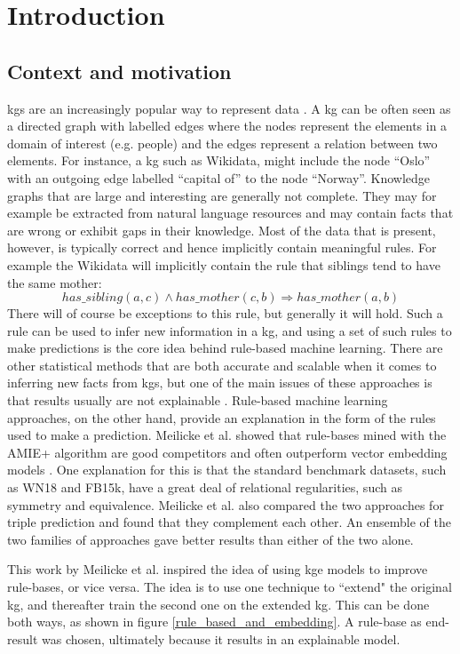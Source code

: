 \chapter{Introduction}
\section{Context and motivation}
\glspl{kg} are an increasingly popular way to represent data \cite{hogan2020knowledge}.
A \gls{kg} can be often seen as a directed graph with labelled edges where the nodes represent the elements in a domain of interest (e.g. people) and the edges represent a relation between two elements. For instance, a \gls{kg} such as Wikidata, might include the node ``Oslo'' with an outgoing edge labelled ``capital of'' to the node ``Norway''. Knowledge graphs that are large and interesting are generally not complete. They may for example be extracted from natural language resources and may contain facts that are wrong or exhibit gaps in their knowledge. Most of the data that is present, however, is typically correct and hence implicitly contain meaningful rules. For example the Wikidata will implicitly contain the rule that siblings tend to have the same mother:
\[has\_sibling(a, c) \wedge has\_mother(c, b) \Rightarrow has\_mother(a, b)\]
There will of course be exceptions to this rule, but generally it will hold. Such a rule can be used to infer new information in a \gls{kg}, and using a set of such rules to make predictions is the core idea behind rule-based machine learning. There are other statistical methods that are both accurate and scalable when it comes to inferring new facts from \glspl{kg}, but one of the main issues of these approaches is that results usually are not explainable \cite{bonatti2019knowledge}. Rule-based machine learning approaches, on the other hand, provide an explanation in the form of the rules used to make a prediction. Meilicke et al. showed that rule-bases mined with the AMIE+ algorithm are good competitors and often outperform vector embedding models \cite{ensemble}. One explanation for this is that the standard benchmark datasets, such as WN18 and FB15k,  have a great deal of relational regularities, such as symmetry and equivalence. Meilicke et al. also compared the two approaches for triple prediction and found that they complement each other. An ensemble of the two families of approaches gave better results than either of the two alone.

This work by Meilicke et al. inspired the idea of using \gls{kge} models to improve rule-bases, or vice versa. The idea is to use one technique to ``extend" the original \gls{kg}, and thereafter train the second one on the extended \gls{kg}. This can be done both ways, as shown in figure \ref{rule_based_and_embedding}. A rule-base as end-result was chosen, ultimately because it results in an explainable model. 

